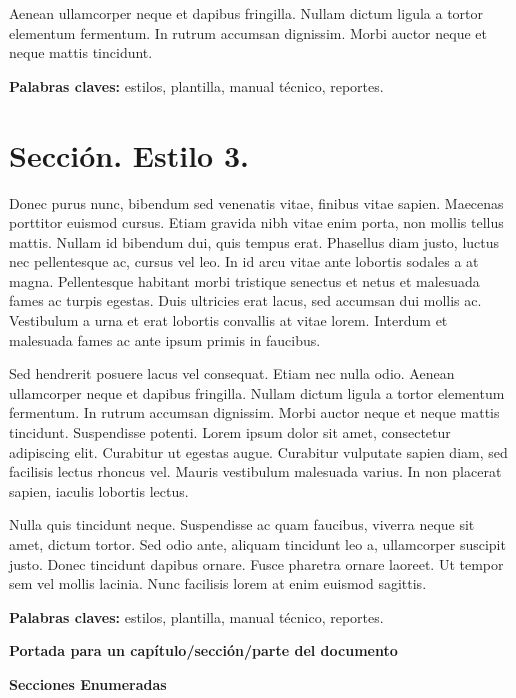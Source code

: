 \documentclass[12pt, a4paper]{article}
\begin{document}
Aenean ullamcorper neque et dapibus fringilla. Nullam dictum ligula a tortor elementum fermentum. In rutrum accumsan dignissim. Morbi auctor neque et neque mattis tincidunt.

\textbf{Palabras claves:} estilos, plantilla, manual técnico, reportes.
\newpage



\part*{Sección. Estilo 3.}
Donec purus nunc, bibendum sed venenatis vitae, finibus vitae sapien. Maecenas porttitor euismod cursus. Etiam gravida nibh vitae enim porta, non mollis tellus mattis. Nullam id bibendum dui, quis tempus erat. Phasellus diam justo, luctus nec pellentesque ac, cursus vel leo. In id arcu vitae ante lobortis sodales a at magna. Pellentesque habitant morbi tristique senectus et netus et malesuada fames ac turpis egestas. Duis ultricies erat lacus, sed accumsan dui mollis ac. Vestibulum a urna et erat lobortis convallis at vitae lorem. Interdum et malesuada fames ac ante ipsum primis in faucibus. 

Sed hendrerit posuere lacus vel consequat. Etiam nec nulla odio. Aenean ullamcorper neque et dapibus fringilla. Nullam dictum ligula a tortor elementum fermentum. In rutrum accumsan dignissim. Morbi auctor neque et neque mattis tincidunt. Suspendisse potenti. Lorem ipsum dolor sit amet, consectetur adipiscing elit. Curabitur ut egestas augue. Curabitur vulputate sapien diam, sed facilisis lectus rhoncus vel. Mauris vestibulum malesuada varius. In non placerat sapien, iaculis lobortis lectus. 

Nulla quis tincidunt neque. Suspendisse ac quam faucibus, viverra neque sit amet, dictum tortor. Sed odio ante, aliquam tincidunt leo a, ullamcorper suscipit justo. Donec tincidunt dapibus ornare. Fusce pharetra ornare laoreet. Ut tempor sem vel mollis lacinia. Nunc facilisis lorem at enim euismod sagittis.

\textbf{Palabras claves:} estilos, plantilla, manual técnico, reportes.
\newpage


\newpage
\vspace*{\fill}
\begin{center} 
\bfseries\fontsize{18}{18}\selectfont Portada para un capítulo/sección/parte del documento\par
\vspace{1.5cm}
\bfseries\fontsize{16}{16}\selectfont Secciones Enumeradas\par
{}
\end{center}
\vspace*{\fill}
\newpage
\end{document}
